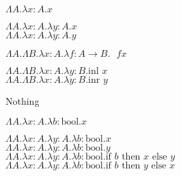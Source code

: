 \documentclass[10pt]{article}
\begin{document}
\begin{exercise}
\begin{enumerate}
\begin{minipage}{.5\textwidth}
\item  $\Lambda A. \lambda x:A. x$   \\
\item $\Lambda A. \lambda x:A. \lambda y:A. x$\\
$\Lambda A. \lambda x:A. \lambda y:A. y$
\item $\Lambda A. \Lambda B. \lambda x:A. \lambda f:A \rightarrow B. \text{ } f x$ \\
\item $\Lambda A. \Lambda B. \lambda x:A. \lambda y:B. \text{inl } x$\\
$\Lambda A. \Lambda B. \lambda x:A. \lambda y:B. \text{inr } y$
\end{minipage}\begin{minipage}{.5\textwidth}
\item Nothing\\
\item $\Lambda A. \lambda x:A. \lambda b:\text{bool}. x $\\
\item  $\Lambda A. \lambda x:A. \lambda y:A. \lambda b:\text{bool}. x $\\
$\Lambda A. \lambda x:A. \lambda y:A. \lambda b:\text{bool}. y $\\
$\Lambda A. \lambda x:A. \lambda y:A. \lambda b:\text{bool}. \text{if } b \text{ then } x \text{ else } y $\\
$\Lambda A. \lambda x:A. \lambda y:A. \lambda b:\text{bool}. \text{if } b \text{ then } y \text{ else } x$\\
\bigskip\bigskip
\end{minipage}
\end{enumerate}
\end{exercise}
\end{document}
